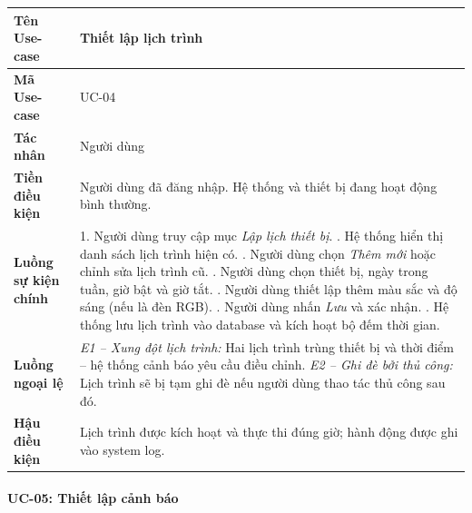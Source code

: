 \begin{table}[H]
\centering
\renewcommand{\arraystretch}{1.4}
\begin{tabular}{|p{3.8cm}|p{10cm}|}
\hline
\textbf{Tên Use-case}       & Thiết lập lịch trình \\ \hline
\textbf{Mã Use-case}        & UC-04 \\ \hline
\textbf{Tác nhân}           & Người dùng \\ \hline
\textbf{Tiền điều kiện}     & Người dùng đã đăng nhập. Hệ thống và thiết bị đang hoạt động bình thường. \\ \hline
\textbf{Luồng sự kiện chính} & 
1. Người dùng truy cập mục \textit{Lập lịch thiết bị}. \newline
2. Hệ thống hiển thị danh sách lịch trình hiện có. \newline
3. Người dùng chọn \textit{Thêm mới} hoặc chỉnh sửa lịch trình cũ. \newline
4. Người dùng chọn thiết bị, ngày trong tuần, giờ bật và giờ tắt. \newline
5. Người dùng thiết lập thêm màu sắc và độ sáng (nếu là đèn RGB). \newline
6. Người dùng nhấn \textit{Lưu} và xác nhận. \newline
7. Hệ thống lưu lịch trình vào database và kích hoạt bộ đếm thời gian. \\ \hline
\textbf{Luồng ngoại lệ}     & 
\textit{E1 -- Xung đột lịch trình:} Hai lịch trình trùng thiết bị và thời điểm -- hệ thống cảnh báo yêu cầu điều chỉnh. \newline
\textit{E2 -- Ghi đè bởi thủ công:} Lịch trình sẽ bị tạm ghi đè nếu người dùng thao tác thủ công sau đó. \\ \hline
\textbf{Hậu điều kiện}      & Lịch trình được kích hoạt và thực thi đúng giờ; hành động được ghi vào system log. \\ \hline
\end{tabular}
\end{table}

\paragraph{UC-05: Thiết lập cảnh báo}

